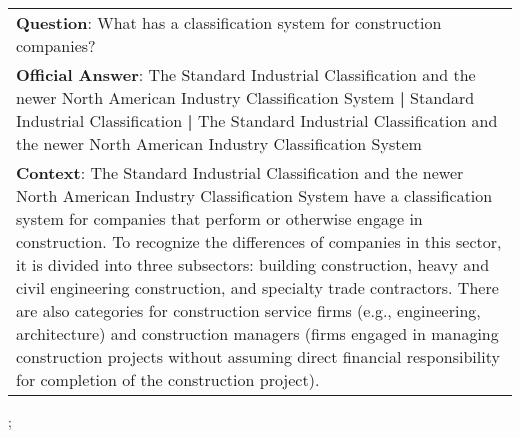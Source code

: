 \begin{figure*}[ht]
{\begin{tabular}{p{}}
            \textbf{Question}: What has a classification system for construction companies?                                                                                                                                                                                                                                                                                                                                                                                                                                                                                                                                                                                                        \\
            \textbf{Official Answer}: The Standard Industrial Classification and the newer North American Industry Classification System \textbf{|} Standard Industrial Classification \textbf{|} The Standard Industrial Classification and the newer North American Industry Classification System                                                                                                                                                                                                                                                                                                                                                                                               \\
            \textbf{Context}: The Standard Industrial Classification and the newer North American Industry Classification System have a classification system for companies that perform or otherwise engage in construction. To recognize the differences of companies in this sector, it is divided into three subsectors: building construction, heavy and civil engineering construction, and specialty trade contractors. There are also categories for construction service firms (e.g., engineering, architecture) and construction managers (firms engaged in managing construction projects without assuming direct financial responsibility for completion of the construction project). \\
        \end{tabular}
    };
    \label{fig:ex-57273f27dd62a815002e9a0c}
\end{figure*}

